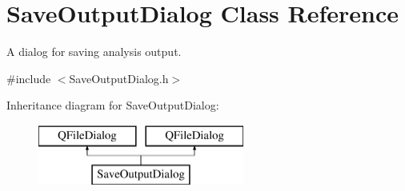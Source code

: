 \hypertarget{class_save_output_dialog}{\section{Save\-Output\-Dialog Class Reference}
\label{class_save_output_dialog}
}


A dialog for saving analysis output.  




{\ttfamily \#include $<$Save\-Output\-Dialog.\-h$>$}

Inheritance diagram for Save\-Output\-Dialog\-:\begin{figure}[H]
\begin{center}
\leavevmode
\includegraphics[height=2.000000cm]{class_save_output_dialog}
\end{center}
\end{figure}
